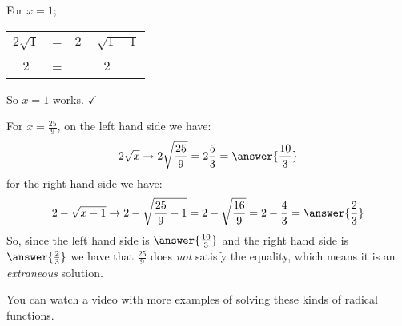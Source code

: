 \documentclass{ximera}
\begin{document}
\begin{example}[Find all $x$ that satisfy the equation $2\sqrt{x} = 2 - \sqrt{x - 1}$]
        For $x = 1$;
        \begin{tabular}{ccc}
            $2\sqrt{1}$ & = & $2 - \sqrt{1 - 1}$    \\
            $2$         & = & $2$
        \end{tabular}
        So $x = 1$ works. $\checkmark$

        For $x = \frac{25}{9}$, on the left hand side we have:
        \[
            2 \sqrt{x} \rightarrow 2 \sqrt{\frac{25}{9}} = 2 \frac{5}{3} = \answer{\frac{10}{3}}
        \]
        for the right hand side we have:
        \[
            2 - \sqrt{x - 1} \rightarrow 2 - \sqrt{\frac{25}{9} - 1} = 2 - \sqrt{\frac{16}{9}} = 2 - \frac{4}{3} = \answer{\frac{2}{3}}
        \]
        So, since the left hand side is $\answer{\frac{10}{3}}$ and the right hand side is $\answer{\frac{2}{3}}$ we have that $\frac{25}{9}$ does \textit{not} satisfy the equality, which means it is an \textit{extraneous} solution.
    \end{example}%


You can watch a video with more examples of solving these kinds of radical functions.

\end{document}
